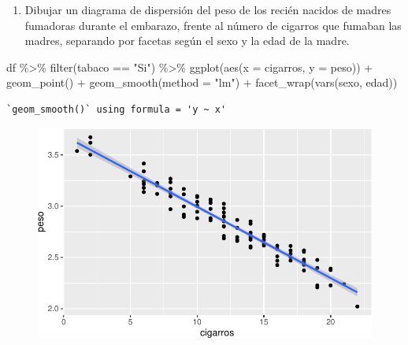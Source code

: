 \documentclass[
  a4paper,
]{scrreport}
\newenvironment{Shaded}{\begin{snugshade}}{\end{snugshade}}
\newcommand{\AttributeTok}[1]{\textcolor[rgb]{0.40,0.45,0.13}{#1}}
\newcommand{\FunctionTok}[1]{\textcolor[rgb]{0.28,0.35,0.67}{#1}}
\newcommand{\NormalTok}[1]{\textcolor[rgb]{0.00,0.23,0.31}{#1}}
\newcommand{\SpecialCharTok}[1]{\textcolor[rgb]{0.37,0.37,0.37}{#1}}
\newcommand{\StringTok}[1]{\textcolor[rgb]{0.13,0.47,0.30}{#1}}
\providecommand{\tightlist}{%
  \setlength{\itemsep}{0pt}\setlength{\parskip}{0pt}}\usepackage{longtable,booktabs,array}
\theoremstyle{definition}
\theoremstyle{definition}
\theoremstyle{remark}
\begin{document}
\begin{enumerate}
\def\labelenumi{\alph{enumi}.}
\setcounter{enumi}{7}
\tightlist
\item
  Dibujar un diagrama de dispersión del peso de los recién nacidos de
  madres fumadoras durante el embarazo, frente al número de cigarros que
  fumaban las madres, separando por facetas según el sexo y la edad de
  la madre.
\end{enumerate}

\begin{tcolorbox}[enhanced jigsaw, rightrule=.15mm, bottomrule=.15mm, opacitybacktitle=0.6, leftrule=.75mm, breakable, toptitle=1mm, left=2mm, colbacktitle=quarto-callout-note-color!10!white, colback=white, arc=.35mm, title=\textcolor{quarto-callout-note-color}{\faInfo}\hspace{0.5em}{Solución}, toprule=.15mm, colframe=quarto-callout-note-color-frame, bottomtitle=1mm, opacityback=0, coltitle=black, titlerule=0mm]

\begin{Shaded}
\begin{Highlighting}[]
\NormalTok{df }\SpecialCharTok{\%\textgreater{}\%} 
    \FunctionTok{filter}\NormalTok{(tabaco }\SpecialCharTok{==} \StringTok{"Si"}\NormalTok{) }\SpecialCharTok{\%\textgreater{}\%}
    \FunctionTok{ggplot}\NormalTok{(}\FunctionTok{aes}\NormalTok{(}\AttributeTok{x =}\NormalTok{ cigarros, }\AttributeTok{y =}\NormalTok{ peso)) }\SpecialCharTok{+}
        \FunctionTok{geom\_point}\NormalTok{() }\SpecialCharTok{+}
        \FunctionTok{geom\_smooth}\NormalTok{(}\AttributeTok{method =} \StringTok{"lm"}\NormalTok{) }\SpecialCharTok{+}
        \FunctionTok{facet\_wrap}\NormalTok{(}\FunctionTok{vars}\NormalTok{(sexo, edad))}
\end{Highlighting}
\end{Shaded}

\begin{verbatim}
`geom_smooth()` using formula = 'y ~ x'
\end{verbatim}

\begin{figure}[H]

{\centering \includegraphics{./07-graficos_files/figure-pdf/unnamed-chunk-40-1.pdf}

}

\end{figure}

\end{tcolorbox}
\end{document}

